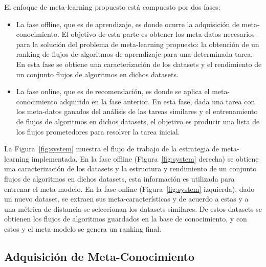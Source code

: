 \documentclass[a4paper,12pt]{article}
\begin{document}
El enfoque de meta-learning propuesto está compuesto por dos fases:
\begin{itemize}
	\item La fase offline, que es de aprendizaje, es donde ocurre la adquisición de meta-conocimiento. El objetivo de esta parte es obtener los meta-datos necesarios para la solución del problema de meta-learning propuesto: la obtención de un ranking de flujos de algoritmos de aprendizaje para una determinada tarea. En esta fase se obtiene una caracterización de los datasets y el rendimiento de un conjunto flujos de algoritmos en dichos datasets.
	\item La fase online, que es de recomendación, es donde se aplica el meta-conocimiento adquirido en la fase anterior. En esta fase, dada una tarea con los meta-datos ganados del análisis de las tareas similares y el entrenamiento de flujos de algoritmos en dichos datasets, el objetivo es producir una lista de los flujos prometedores para resolver la tarea inicial.
\end{itemize}

La Figura~\ref{fig:system} muestra el flujo de trabajo de la estrategia de meta-learning implementada. En la fase offline (Figura~\ref{fig:system} derecha) se obtiene una caracterización de los datasets y la estructura y rendimiento de un conjunto flujos de algoritmos en dichos datasets, esta información es utilizada para entrenar el meta-modelo. En la fase online (Figura~\ref{fig:system} izquierda), dado un nuevo dataset, se extraen sus meta-características y de acuerdo a estas y a una métrica de distancia se seleccionan los datasets similares. De estos datasets se obtienen los flujos de algoritmos guardados en la base de conocimiento, y con estos y el meta-modelo se genera un ranking final.

	\subsection{Adquisición de Meta-Conocimiento}
\end{document}
